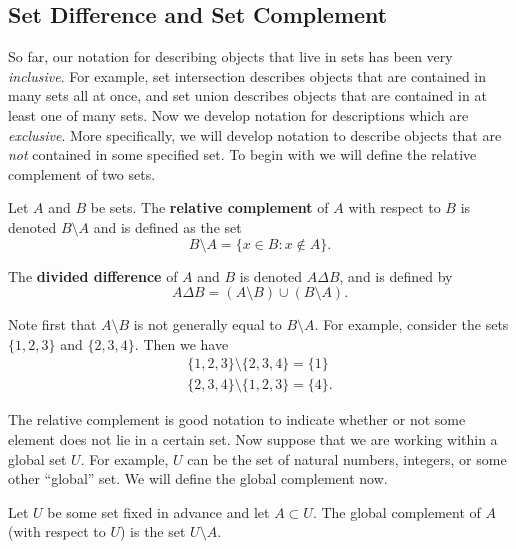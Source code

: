 \subsection{Set Difference and Set Complement}

So far, our notation for describing objects that live in sets has been very \textit{inclusive}. For example, set intersection describes objects that are contained in many sets all at once, and set union describes objects that are contained in at least one of many sets. Now we develop notation for descriptions which are \textit{exclusive}. More specifically, we will develop notation to describe objects that are \textit{not} contained in some specified set. To begin with we will define the relative complement of two sets.

\begin{definition}
Let $A$ and $B$ be sets. The \textbf{relative complement} of $A$ with respect to $B$ is denoted $B \setminus A$ and is defined as the set
\[B \setminus A = \{x \in B \colon x \not\in A\}.\]

The \textbf{divided difference} of $A$ and $B$ is denoted $A \Delta B$, and is defined by
\[A \Delta B = (A \setminus B) \cup (B \setminus A).\]
\end{definition} 

Note first that $A \setminus B$ is not generally equal to $B \setminus A$. For example, consider the sets $\{1, 2, 3\}$ and $\{2, 3, 4\}$. Then we have
\begin{gather*}
	\{1,2,3\} \setminus \{2, 3, 4\} = \{1\} \\
	\{2, 3, 4\} \setminus\{1,2,3\} = \{4\}.
\end{gather*}

The relative complement is good notation to indicate whether or not some element does not lie in a certain set. Now suppose that we are working within a global set $U$. For example, $U$ can be the set of natural numbers, integers, or some other ``global'' set. We will define the global complement now.

\begin{definition}
Let $U$ be some set fixed in advance and let $A \subset U$. The global complement of $A$ (with respect to $U$) is the set $U \setminus A$.
\end{definition}


